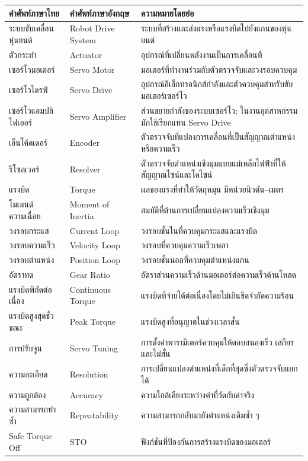 \begin{table}[htbp]
    \centering
    \begin{tabular}{l l l}
        \hline
        \textbf{คำศัพท์ภาษาไทย} & \textbf{คำศัพท์ภาษาอังกฤษ} & \textbf{ความหมายโดยย่อ} \\
        \hline
        ระบบขับเคลื่อนหุ่นยนต์ & Robot Drive System & ระบบที่สร้างและส่งแรงหรือแรงบิดไปยังแกนของหุ่นยนต์ \\
        ตัวกระทำ & Actuator & อุปกรณ์ที่เปลี่ยนพลังงานเป็นการเคลื่อนที่ \\
        เซอร์โวมอเตอร์ & Servo Motor & มอเตอร์ที่ทำงานร่วมกับตัวตรวจจับและวงรอบควบคุม \\
        เซอร์โวไดรฟ์ & Servo Drive & อุปกรณ์อิเล็กทรอนิกส์กำลังและตัวควบคุมสำหรับขับมอเตอร์เซอร์โว \\
        เซอร์โวแอมปลิไฟเออร์ & Servo Amplifier & ส่วนขยายกำลังของระบบเซอร์โว; ในงานอุตสาหกรรมมักใช้เรียกแทน Servo Drive \\
        เอ็นโค้ดเดอร์ & Encoder & ตัวตรวจจับที่แปลงการเคลื่อนที่เป็นสัญญาณตำแหน่งหรือความเร็ว \\
        รีโซลเวอร์ & Resolver & ตัวตรวจจับตำแหน่งเชิงมุมแบบแม่เหล็กไฟฟ้าที่ให้สัญญาณไซน์และโคไซน์ \\
        แรงบิด & Torque & ผลของแรงที่ทำให้วัตถุหมุน มีหน่วยนิวตัน–เมตร \\
        โมเมนต์ความเฉื่อย & Moment of Inertia & สมบัติที่ต้านการเปลี่ยนแปลงความเร็วเชิงมุม \\
        วงรอบกระแส & Current Loop & วงรอบชั้นในที่ควบคุมกระแสและแรงบิด \\
        วงรอบความเร็ว & Velocity Loop & วงรอบที่ควบคุมความเร็วเพลา \\
        วงรอบตำแหน่ง & Position Loop & วงรอบชั้นนอกที่ควบคุมตำแหน่งแกน \\
        อัตราทด & Gear Ratio & อัตราส่วนความเร็วด้านมอเตอร์ต่อความเร็วด้านโหลด \\
        แรงบิดพิกัดต่อเนื่อง & Continuous Torque & แรงบิดที่จ่ายได้ต่อเนื่องโดยไม่เกินขีดจำกัดความร้อน \\
        แรงบิดสูงสุดชั่วขณะ & Peak Torque & แรงบิดสูงที่อนุญาตในช่วงเวลาสั้น \\
        การปรับจูน & Servo Tuning & การตั้งค่าพารามิเตอร์ควบคุมให้ตอบสนองเร็ว เสถียร และไม่สั่น \\
        ความละเอียด & Resolution & การเปลี่ยนแปลงตำแหน่งที่เล็กที่สุดซึ่งตัวตรวจจับแยกได้ \\
        ความถูกต้อง & Accuracy & ความใกล้เคียงระหว่างค่าที่วัดกับค่าจริง \\
        ความสามารถทำซ้ำ & Repeatability & ความสามารถกลับมายังตำแหน่งเดิมซ้ำ ๆ \\
        Safe Torque Off & STO & ฟังก์ชันที่ป้องกันการสร้างแรงบิดของมอเตอร์ \\
        \hline
    \end{tabular}
\end{table}


